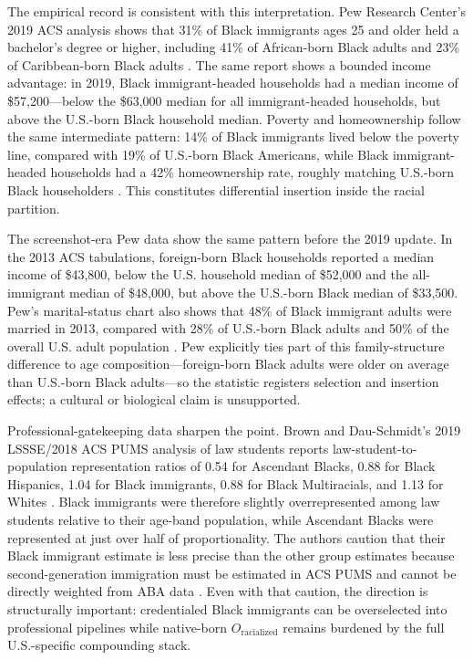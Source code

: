The empirical record is consistent with this interpretation. Pew Research Center's 2019 ACS analysis shows that 31\% of Black immigrants ages 25 and older held a bachelor's degree or higher, including 41\% of African-born Black adults and 23\% of Caribbean-born Black adults \cite{pew_black_immigrants_2022}. The same report shows a bounded income advantage: in 2019, Black immigrant-headed households had a median income of \$57,200---below the \$63,000 median for all immigrant-headed households, but above the U.S.-born Black household median. Poverty and homeownership follow the same intermediate pattern: 14\% of Black immigrants lived below the poverty line, compared with 19\% of U.S.-born Black Americans, while Black immigrant-headed households had a 42\% homeownership rate, roughly matching U.S.-born Black householders \cite{pew_black_immigrants_2022}. This constitutes differential insertion inside the racial partition.

The screenshot-era Pew data show the same pattern before the 2019 update. In the 2013 ACS tabulations, foreign-born Black households reported a median income of \$43,800, below the U.S. household median of \$52,000 and the all-immigrant median of \$48,000, but above the U.S.-born Black median of \$33,500. Pew's marital-status chart also shows that 48\% of Black immigrant adults were married in 2013, compared with 28\% of U.S.-born Black adults and 50\% of the overall U.S. adult population \cite{pew_black_immigrants_2015}. Pew explicitly ties part of this family-structure difference to age composition---foreign-born Black adults were older on average than U.S.-born Black adults---so the statistic registers selection and insertion effects; a cultural or biological claim is unsupported.

Professional-gatekeeping data sharpen the point. Brown and Dau-Schmidt's 2019 LSSSE/2018 ACS PUMS analysis of law students reports law-student-to-population representation ratios of 0.54 for Ascendant Blacks, 0.88 for Black Hispanics, 1.04 for Black immigrants, 0.88 for Black Multiracials, and 1.13 for Whites \cite{brown_dau_schmidt_lssse_2022}. Black immigrants were therefore slightly overrepresented among law students relative to their age-band population, while Ascendant Blacks were represented at just over half of proportionality. The authors caution that their Black immigrant estimate is less precise than the other group estimates because second-generation immigration must be estimated in ACS PUMS and cannot be directly weighted from ABA data \cite{brown_dau_schmidt_lssse_2022}. Even with that caution, the direction is structurally important: credentialed Black immigrants can be overselected into professional pipelines while native-born $O_{\text{racialized}}$ remains burdened by the full U.S.-specific compounding stack.

